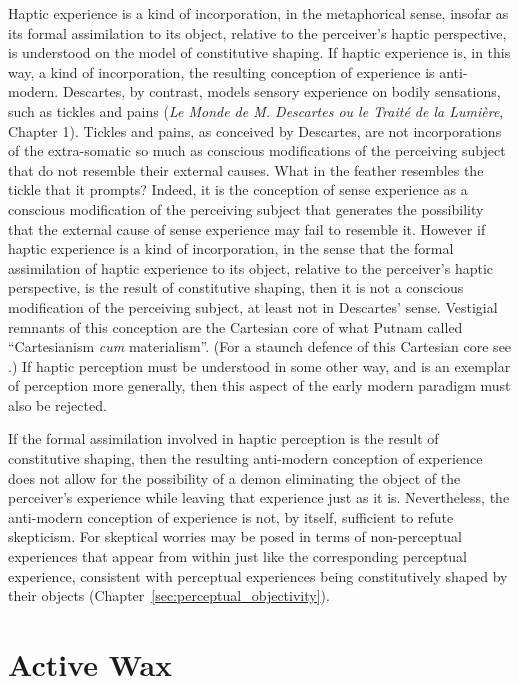 Haptic experience is a kind of incorporation, in the metaphorical sense, insofar as its formal assimilation to its object, relative to the perceiver's haptic perspective, is understood on the model of constitutive shaping. If haptic experience is, in this way, a kind of incorporation, the resulting conception of experience is anti-modern. Descartes, by contrast, models sensory experience on bodily sensations, such as tickles and pains (\emph{Le Monde de M. Descartes ou le Traité de la Lumière}, Chapter 1). Tickles and pains, as conceived by Descartes, are not incorporations of the extra-somatic so much as conscious modifications of the perceiving subject that do not resemble their external causes. What in the feather resembles the tickle that it prompts? Indeed, it is the conception of sense experience as a conscious modification of the perceiving subject that generates the possibility that the external cause of sense experience may fail to resemble it. However if haptic experience is a kind of incorporation, in the sense that the formal assimilation of haptic experience to its object, relative to the perceiver's haptic perspective, is the result of constitutive shaping, then it is not a conscious modification of the perceiving subject, at least not in Descartes' sense. Vestigial remnants of this conception are the Cartesian core of what Putnam called ``Cartesianism \emph{cum} materialism''. (For a staunch defence of this Cartesian core see \citealt{Farkas:2008aa}.) If haptic perception must be understood in some other way, and is an exemplar of perception more generally, then this aspect of the early modern paradigm must also be rejected.

If the formal assimilation involved in haptic perception is the result of constitutive shaping, then the resulting anti-modern conception of experience does not allow for the possibility of a demon eliminating the object of the perceiver's experience while leaving that experience just as it is. Nevertheless, the anti-modern conception of experience is not, by itself, sufficient to refute skepticism. For skeptical worries may be posed in terms of non-perceptual experiences that appear from within just like the corresponding perceptual experience, consistent with perceptual experiences being constitutively shaped by their objects (Chapter~\ref{sec:perceptual_objectivity}). 


\section{Active Wax} %
\label{sec:active_wax}

